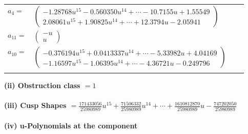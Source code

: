 \documentclass[1p]{elsarticle_modified}
\theoremstyle{definition}
\begin{document}
\begin{tabular}{m{7pt} m{180pt} m{7pt} m{180pt} }
\flushright $a_{4}=$&$\begin{pmatrix}-1.28768 u^{15}-0.560350 u^{14}+\cdots-10.7155 u+1.55549\\2.08061 u^{15}+1.90825 u^{14}+\cdots+12.3794 u-2.05941\end{pmatrix}$ \\
\flushright $a_{11}=$&$\begin{pmatrix}- u\\u\end{pmatrix}$ \\
\flushright $a_{10}=$&$\begin{pmatrix}-0.376194 u^{15}+0.0413337 u^{14}+\cdots-5.33982 u+4.04169\\-1.16597 u^{15}-1.06395 u^{14}+\cdots-4.36721 u-0.249796\end{pmatrix}$\\&\end{tabular}
\flushleft \textbf{(ii) Obstruction class $= 1$}\\~\\
\flushleft \textbf{(iii) Cusp Shapes $= \frac{171433056}{25980989} u^{15}+\frac{71506332}{25980989} u^{14}+\cdots+\frac{1610812870}{25980989} u-\frac{747202050}{25980989}$}\\~\\
\newpage\renewcommand{\arraystretch}{1}
\flushleft \textbf{(iv) u-Polynomials at the component}\newline \\
\end{document}
